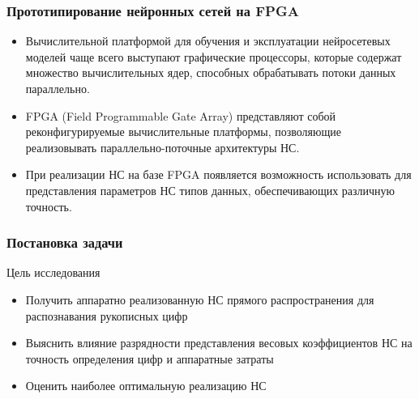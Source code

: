 \begin{frame}
\frametitle{Прототипирование нейронных сетей на FPGA}

    \begin{itemize}
        \item Вычислительной платформой для обучения и
        эксплуатации нейросетевых моделей чаще всего выступают графические процессоры,
        которые содержат множество вычислительных ядер, способных обрабатывать потоки данных
        параллельно. 
        \item FPGA (Field Programmable Gate Array) представляют собой реконфигурируемые вычислительные
        платформы, позволяющие реализовывать параллельно-поточные архитектуры НС.
        \item При реализации НС на базе FPGA появляется
        возможность использовать для представления параметров НС типов данных, обеспечивающих
        различную точность.
    \end{itemize}

\end{frame}

\begin{frame}
\frametitle{Постановка задачи}

\begin{block}{\centering Цель исследования}                
    \begin{itemize}\small
        \item Получить аппаратно реализованную НС прямого распространения для распознавания рукописных цифр
        \item Выяснить влияние разрядности представления весовых коэффициентов НС на точность определения цифр и аппаратные затраты
        \item Оценить наиболее оптимальную реализацию НС           
    \end{itemize}
\end{block}
\end{frame}
